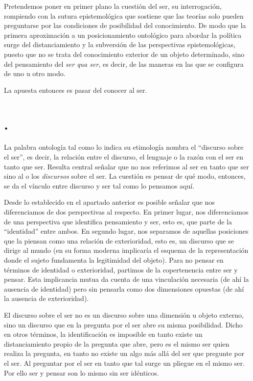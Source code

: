 Pretendemos poner en primer plano la cuestión del ser, su interrogación, rompiendo con la sutura epistemológica que sostiene que las teorías solo pueden preguntarse por las condiciones de posibilidad del conocimiento. De modo que la primera aproximación a un posicionamiento ontológico para abordar la política surge del distanciamiento y la subversión de las perspectivas epistemológicas, puesto que no se trata del conocimiento exterior de un objeto determinado, sino del pensamiento del \emph{ser qua ser}, es decir, de las maneras en las que se configura de uno u otro modo.

La apuesta entonces es pasar del conocer al ser.


\section*{.}

La palabra ontología tal como lo indica su etimología nombra el \enquote{discurso sobre el ser}, es decir, la relación entre el discurso, el lenguaje o la razón con el ser en tanto que ser. Resulta central señalar que no nos referimos al ser en tanto que ser  sino al o los \emph{discursos} sobre el ser. La cuestión es pensar de qué modo, entonces, se da el vínculo entre discurso y ser tal como lo pensamos aquí.

Desde lo establecido en el apartado anterior es posible señalar que nos diferenciamos de dos perspectivas al respecto. En primer lugar, nos diferenciamos de una perspectiva que identifica pensamiento y ser, esto es, que parte de la \enquote{identidad} entre ambos. En segundo lugar, nos separamos de aquellas posiciones que la piensan como una relación de exterioridad, esto es, un discurso que se dirige al mundo (en su forma moderna implicaría el esquema de la representación donde el sujeto fundamenta la legitimidad del objeto). Para no pensar en términos de identidad o exterioridad, partimos de la copertenencia entre ser y pensar. Esta implicancia mutua da cuenta de una vinculación necesaria (de ahí la ausencia de identidad) pero sin pensarla como dos dimensiones opuestas (de ahí la  \linebreak ausencia de exterioridad).

El discurso sobre el ser no es un discurso sobre una dimensión u objeto externo, sino un discurso que en la pregunta por el ser abre su misma posibilidad. Dicho en otros términos, la identificación es imposible en tanto existe un distanciamiento propio de la pregunta que abre, pero es el mismo ser quien realiza la pregunta, en tanto no existe un algo más allá del ser que pregunte por el ser. Al preguntar por el ser en tanto que tal surge un pliegue en el mismo ser. Por ello ser y pensar son lo mismo sin ser idénticos.

